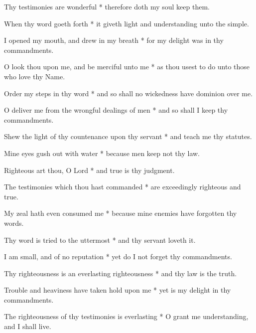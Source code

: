 Thy testimonies are wonderful * therefore doth my soul keep them.

When thy word goeth forth * it giveth light and understanding unto the simple.

I opened my mouth, and drew in my breath * for my delight was in thy commandments.

O look thou upon me, and be merciful unto me * as thou usest to do unto those who love thy Name.

Order my steps in thy word * and so shall no wickedness have dominion over me.

O deliver me from the wrongful dealings of men * and so shall I keep thy commandments.

Shew the light of thy countenance upon thy servant * and teach me thy statutes.

Mine eyes gush out with water * because men keep not thy law.

Righteous art thou, O Lord * and true is thy judgment.

The testimonies which thou hast commanded * are exceedingly righteous and true.

My zeal hath even consumed me * because mine enemies have forgotten thy words.

Thy word is tried to the uttermost * and thy servant loveth it.

I am small, and of no reputation * yet do I not forget thy commandments.

Thy righteousness is an everlasting righteousness * and thy law is the truth.

Trouble and heaviness have taken hold upon me * yet is my delight in thy commandments.

The righteousness of thy testimonies is everlasting * O grant me understanding, and I shall live.